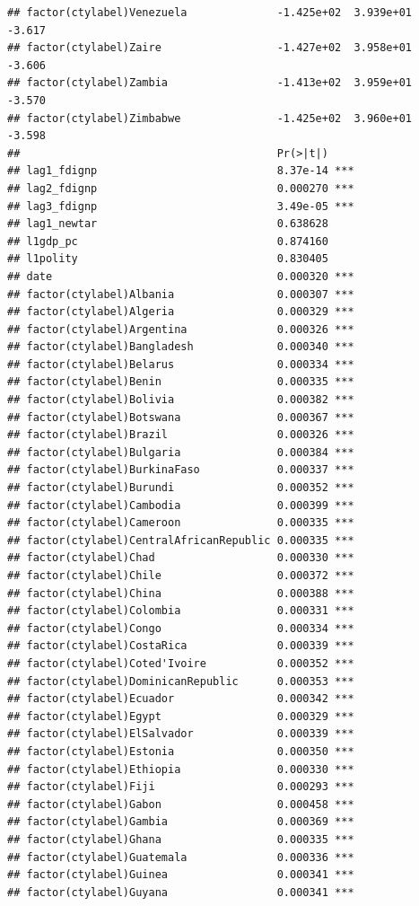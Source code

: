 \documentclass[12pt]{article}\usepackage[]{graphicx}\usepackage[]{color}
\makeatletter
\newenvironment{kframe}{%
 \def\at@end@of@kframe{}%
 \ifinner\ifhmode%
  \def\at@end@of@kframe{\end{minipage}}%
  \begin{minipage}{\columnwidth}%
 \fi\fi%
 \def\FrameCommand##1{\hskip\@totalleftmargin \hskip-\fboxsep
 \colorbox{shadecolor}{##1}\hskip-\fboxsep
     \hskip-\linewidth \hskip-\@totalleftmargin \hskip\columnwidth}%
 \MakeFramed {\advance\hsize-\width
   \@totalleftmargin\z@ \linewidth\hsize
   \@setminipage}}%
 {\par\unskip\endMakeFramed%
 \at@end@of@kframe}
\newenvironment{knitrout}{}{} %
\makeatother
\begin{document}
\begin{knitrout}
\begin{kframe}
\begin{verbatim}
## factor(ctylabel)Venezuela              -1.425e+02  3.939e+01  -3.617
## factor(ctylabel)Zaire                  -1.427e+02  3.958e+01  -3.606
## factor(ctylabel)Zambia                 -1.413e+02  3.959e+01  -3.570
## factor(ctylabel)Zimbabwe               -1.425e+02  3.960e+01  -3.598
##                                        Pr(>|t|)    
## lag1_fdignp                            8.37e-14 ***
## lag2_fdignp                            0.000270 ***
## lag3_fdignp                            3.49e-05 ***
## lag1_newtar                            0.638628    
## l1gdp_pc                               0.874160    
## l1polity                               0.830405    
## date                                   0.000320 ***
## factor(ctylabel)Albania                0.000307 ***
## factor(ctylabel)Algeria                0.000329 ***
## factor(ctylabel)Argentina              0.000326 ***
## factor(ctylabel)Bangladesh             0.000340 ***
## factor(ctylabel)Belarus                0.000334 ***
## factor(ctylabel)Benin                  0.000335 ***
## factor(ctylabel)Bolivia                0.000382 ***
## factor(ctylabel)Botswana               0.000367 ***
## factor(ctylabel)Brazil                 0.000326 ***
## factor(ctylabel)Bulgaria               0.000384 ***
## factor(ctylabel)BurkinaFaso            0.000337 ***
## factor(ctylabel)Burundi                0.000352 ***
## factor(ctylabel)Cambodia               0.000399 ***
## factor(ctylabel)Cameroon               0.000335 ***
## factor(ctylabel)CentralAfricanRepublic 0.000335 ***
## factor(ctylabel)Chad                   0.000330 ***
## factor(ctylabel)Chile                  0.000372 ***
## factor(ctylabel)China                  0.000388 ***
## factor(ctylabel)Colombia               0.000331 ***
## factor(ctylabel)Congo                  0.000334 ***
## factor(ctylabel)CostaRica              0.000339 ***
## factor(ctylabel)Coted'Ivoire           0.000352 ***
## factor(ctylabel)DominicanRepublic      0.000353 ***
## factor(ctylabel)Ecuador                0.000342 ***
## factor(ctylabel)Egypt                  0.000329 ***
## factor(ctylabel)ElSalvador             0.000339 ***
## factor(ctylabel)Estonia                0.000350 ***
## factor(ctylabel)Ethiopia               0.000330 ***
## factor(ctylabel)Fiji                   0.000293 ***
## factor(ctylabel)Gabon                  0.000458 ***
## factor(ctylabel)Gambia                 0.000369 ***
## factor(ctylabel)Ghana                  0.000335 ***
## factor(ctylabel)Guatemala              0.000336 ***
## factor(ctylabel)Guinea                 0.000341 ***
## factor(ctylabel)Guyana                 0.000341 ***

\end{verbatim}
\end{kframe}
\end{knitrout}
\end{document}
